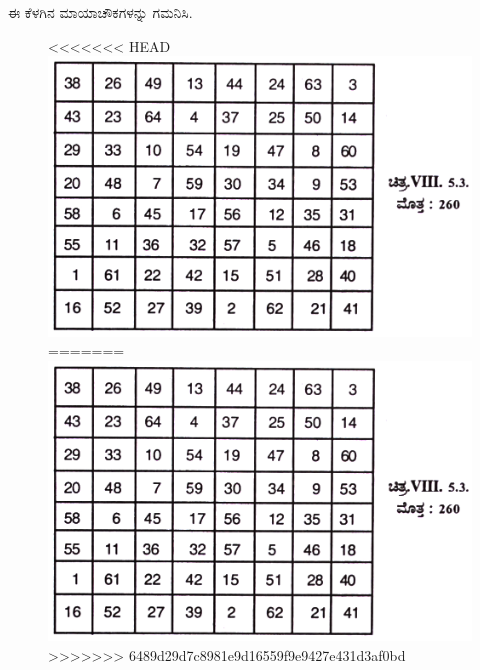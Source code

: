 ಈ ಕೆಳಗಿನ ಮಾಯಾಚೌಕಗಳನ್ನು ಗಮನಿಸಿ.
\begin{figure}[H]
<<<<<<< HEAD
\includegraphics{src/figures/chap7/fig7-17.jpg}
=======
\includegraphics[scale=0.85]{src/figures/chap7/fig7.17.jpg}
>>>>>>> 6489d29d7c8981e9d16559f9e9427e431d3af0bd
\end{figure}


